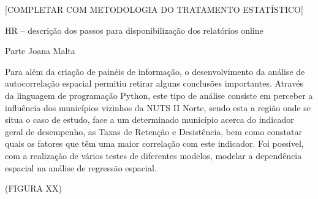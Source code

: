 \documentclass[
]{book}
\theoremstyle{definition}
\theoremstyle{definition}
\theoremstyle{definition}
\theoremstyle{definition}
\theoremstyle{remark}
\begin{document}
{[}COMPLETAR COM METODOLOGIA DO TRATAMENTO ESTATÍSTICO{]}

HR -- descrição dos passos para disponibilização dos relatórios online

Parte Joana Malta

Para além da criação de painéis de informação, o desenvolvimento da análise de autocorrelação espacial permitiu retirar alguns conclusões importantes. Através da linguagem de programação Python, este tipo de análise consiste em perceber a influência dos municípios vizinhos da NUTS II Norte, sendo esta a região onde se situa o caso de estudo, face a um determinado município acerca do indicador geral de desempenho, as Taxas de Retenção e Desistência, bem como constatar quais os fatores que têm uma maior correlação com este indicador. Foi possível, com a realização de vários testes de diferentes modelos, modelar a dependência espacial na análise de regressão espacial.

(FIGURA XX)
\end{document}
